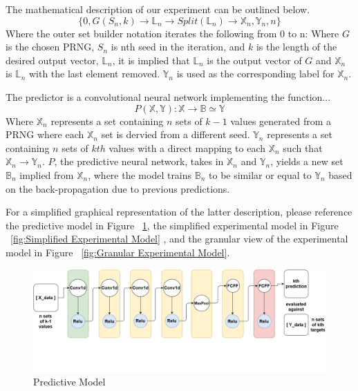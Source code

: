 \documentclass[conference]{IEEEtran}
\begin{document}
The mathematical description of our experiment can be outlined below. 
\begin{equation}
\{0, G(S_n, k) \rightarrow \mathbb{L}_n \rightarrow Split(\mathbb{L}_n) \rightarrow \mathbb{X}_n,\mathbb{Y}_n , n \}
\end{equation}
Where the outer set builder notation iterates the following from 0 to n:
Where $G$ is the chosen PRNG, $S_n$ is nth seed in the iteration, and $k$ is the length of the desired output vector, $\mathbb{L}_n$, it is implied that $\mathbb{L}_n$ is the output vector of $G$ and $\mathbb{X}_n$ is $\mathbb{L}_n$ with the last element removed. $\mathbb{Y}_n$  is  used  as  the  corresponding  label for $\mathbb{X}_n$.

The predictor is a convolutional neural network implementing the function...
\begin{equation}
P(\mathbb{X},\mathbb{Y}): \mathbb{X} \rightarrow \mathbb{B} \simeq \mathbb{Y}
\end{equation}
Where $\mathbb{X}_n$ represents a set containing $n$ sets of $k-1$ values generated from a PRNG where each $\mathbb{X}_n$ set is dervied from a different seed. $\mathbb{Y}_n$ represents a set containing $n$ sets of $kth$ values with a direct mapping to each $\mathbb{X}_n$ such that $\mathbb{X}_n \rightarrow \mathbb{Y}_n$. $P$, the predictive neural network, takes in $\mathbb{X}_n$ and $\mathbb{Y}_n$, yields a new set $\mathbb{B}_n$ implied from $\mathbb{X}_n$, where the model trains $\mathbb{B}_n$ to be similar or equal to $\mathbb{Y}_n$ based on the back-propagation due to previous predictions. 

For a simplified graphical representation of the latter description, please reference the predictive model in Figure ~\ref{fig:Predictive Model}, the simplified experimental model in Figure ~\ref{fig:Simplified Experimental Model} , and the granular view of the experimental model in Figure ~\ref{fig:Granular Experimental Model}.

\begin{figure}[H]
\centering
\includegraphics[width=1\linewidth]{./Images/PredictiveModel.png}
\caption{Predictive Model}
\label{fig:Predictive Model}
\end{figure}
\end{document}
